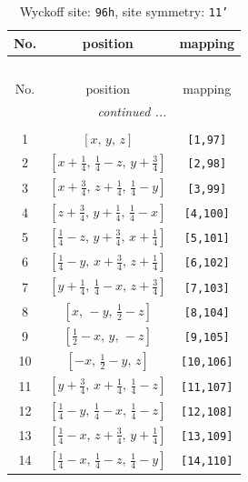 \documentclass[fleqn,8pt]{jsarticle}
\begin{document}
\begin{longtable}{ccc}
\caption{Wyckoff site: {\tt 96h}, site symmetry: {\tt 11'}}
 \\
 \hline \hline
No. & position & mapping \\ \hline \endfirsthead

\multicolumn{2}{l}{\tablename\ \thetable{}} \\
 \hline \hline
No. & position & mapping \\ \hline \endhead

 \hline \hline
\multicolumn{2}{r}{\footnotesize\it continued ...} \\ \endfoot

 \hline \hline
\multicolumn{2}{r}{} \\ \endlastfoot

1 & $\left[ x,\, y,\, z \right]$ & {\tt [1,97]} \\ \hline
2 & $\left[ x + \frac{1}{4},\, \frac{1}{4} - z,\, y + \frac{3}{4} \right]$ & {\tt [2,98]} \\ \hline
3 & $\left[ x + \frac{3}{4},\, z + \frac{1}{4},\, \frac{1}{4} - y \right]$ & {\tt [3,99]} \\ \hline
4 & $\left[ z + \frac{3}{4},\, y + \frac{1}{4},\, \frac{1}{4} - x \right]$ & {\tt [4,100]} \\ \hline
5 & $\left[ \frac{1}{4} - z,\, y + \frac{3}{4},\, x + \frac{1}{4} \right]$ & {\tt [5,101]} \\ \hline
6 & $\left[ \frac{1}{4} - y,\, x + \frac{3}{4},\, z + \frac{1}{4} \right]$ & {\tt [6,102]} \\ \hline
7 & $\left[ y + \frac{1}{4},\, \frac{1}{4} - x,\, z + \frac{3}{4} \right]$ & {\tt [7,103]} \\ \hline
8 & $\left[ x,\, - y,\, \frac{1}{2} - z \right]$ & {\tt [8,104]} \\ \hline
9 & $\left[ \frac{1}{2} - x,\, y,\, - z \right]$ & {\tt [9,105]} \\ \hline
10 & $\left[ - x,\, \frac{1}{2} - y,\, z \right]$ & {\tt [10,106]} \\ \hline
11 & $\left[ y + \frac{3}{4},\, x + \frac{1}{4},\, \frac{1}{4} - z \right]$ & {\tt [11,107]} \\ \hline
12 & $\left[ \frac{1}{4} - y,\, \frac{1}{4} - x,\, \frac{1}{4} - z \right]$ & {\tt [12,108]} \\ \hline
13 & $\left[ \frac{1}{4} - x,\, z + \frac{3}{4},\, y + \frac{1}{4} \right]$ & {\tt [13,109]} \\ \hline
14 & $\left[ \frac{1}{4} - x,\, \frac{1}{4} - z,\, \frac{1}{4} - y \right]$ & {\tt [14,110]} \\ \hline

\end{longtable}
\end{document}
